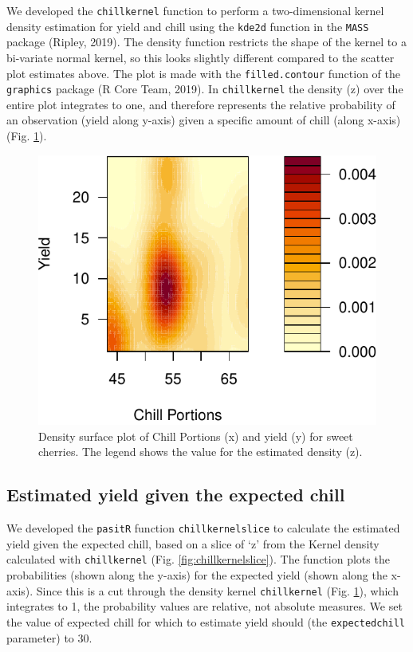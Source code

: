 \documentclass[]{article}
\begin{document}
We developed the \texttt{chillkernel} function to perform a
two-dimensional kernel density estimation for yield and chill using the
\texttt{kde2d} function in the \texttt{MASS} package (Ripley, 2019). The
density function restricts the shape of the kernel to a bi-variate
normal kernel, so this looks slightly different compared to the scatter
plot estimates above. The plot is made with the \texttt{filled.contour}
function of the \texttt{graphics} package (R Core Team, 2019). In
\texttt{chillkernel} the density (z) over the entire plot integrates to
one, and therefore represents the relative probability of an observation
(yield along y-axis) given a specific amount of chill (along x-axis)
(Fig. \ref{fig:chillkernel}).

\begin{figure}
\centering
\includegraphics{Full_SHE_Chill_Yield_Model_files/figure-latex/chillkernel-1.pdf}
\caption{\label{fig:chillkernel}Density surface plot of Chill Portions
(x) and yield (y) for sweet cherries. The legend shows the value for the
estimated density (z).}
\end{figure}

\hypertarget{estimated-yield-given-the-expected-chill}{%
\subsection{Estimated yield given the expected
chill}\label{estimated-yield-given-the-expected-chill}}

We developed the \texttt{pasitR} function \texttt{chillkernelslice} to
calculate the estimated yield given the expected chill, based on a slice
of `z' from the Kernel density calculated with \texttt{chillkernel}
(Fig. \ref{fig:chillkernelslice}). The function plots the probabilities
(shown along the y-axis) for the expected yield (shown along the
x-axis). Since this is a cut through the density kernel
\texttt{chillkernel} (Fig. \ref{fig:chillkernel}), which integrates to
1, the probability values are relative, not absolute measures. We set
the value of expected chill for which to estimate yield should (the
\texttt{expectedchill} parameter) to 30.
\end{document}
